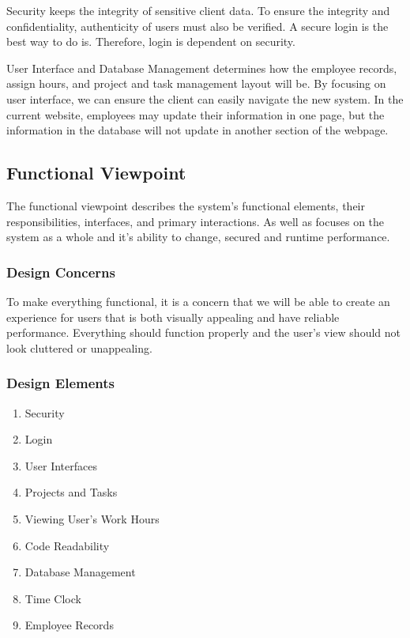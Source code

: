 \documentclass[letterpaper,10pt,titlepage,journal,compsoc,draftclsnofoot,onecolumn]{IEEEtran}
\newcommand\tab[1][1cm]{\hspace*{#1}}
\begin{document}
\tab Security keeps the integrity of sensitive client data. To ensure the integrity and confidentiality, authenticity of users must also be verified. A secure login is the best way to do is. Therefore, login is dependent on security.\newline


\tab User Interface and Database Management determines how the employee records, assign hours, and project and task management layout will be.  By focusing on user interface, we can ensure the client can easily navigate the new system. In the current website, employees may update their information in one page, but the information in the database will not update in another section of the webpage. \newline

\subsection{Functional Viewpoint}

The functional viewpoint describes the system's functional elements, their responsibilities, interfaces, and primary interactions. As well as focuses on the system as a whole and it's ability to change, secured and runtime performance.

\subsubsection{Design Concerns}

To make everything functional, it is a concern that we will be able to create an experience for users that is both visually appealing and have reliable performance. Everything should function properly and the user's view should not look cluttered or unappealing. 

\subsubsection{Design Elements}

\begin{enumerate}
\item{Security}
\item{Login}
\item{User Interfaces}
\item{Projects and Tasks}
\item{Viewing User's Work Hours}
\item{Code Readability}
\item{Database Management}
\item{Time Clock}
\item{Employee Records}
\end{enumerate}
\end{document}
